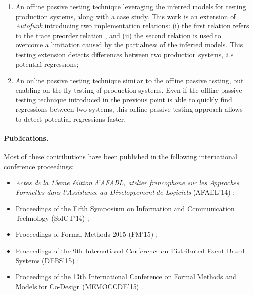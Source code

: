 \begin{enumerate}
    \item An offline passive testing technique leveraging the
        inferred models for testing production systems, along
        with a case study. This work is an extension of
        \textit{Autofunk} introducing two implementation
        relations: (i) the first relation refers to the trace
        preorder relation \cite{DNH84}, and (ii) the second
        relation is used to overcome a limitation caused by the
        partialness of the inferred models. This testing
        extension detects differences between two production
        systems, \emph{i.e.} potential regressions;

    \item An online passive testing technique similar to the
        offline passive testing, but enabling on-the-fly testing
        of production systems. Even if the offline passive
        testing technique introduced in the previous point is
        able to quickly find regressions between two systems,
        this online passive testing approach allows to detect
        potential regressions faster.
\end{enumerate}

\paragraph{Publications.} Most of these contributions have been
published in the following international conference proceedings:

\begin{itemize}
    \item \emph{Actes de la 13eme {\'e}dition d'AFADL, atelier
        francophone sur les Approches Formelles dans l'Assistance au
        D{\'e}veloppement de Logiciels} (AFADL'14)
        \cite{durand2014inference};

    \item Proceedings of the Fifth Symposium on Information and
        Communication Technology (SoICT'14)
        \cite{DBLP:conf/soict/DurandS14};

    \item Proceedings of Formal Methods 2015 (FM'15)
        \cite{DBLP:conf/fm/DurandS15};

    \item Proceedings of the 9th International Conference on
        Distributed Event-Based Systems (DEBS'15)
        \cite{DBLP:conf/debs/SalvaD15};

    \item Proceedings of the 13th International Conference on Formal
        Methods and Models for Co-Design (MEMOCODE'15)
        \cite{7340480}.
\end{itemize}

